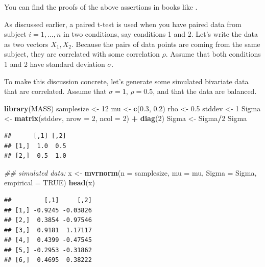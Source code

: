 \documentclass[12pt,]{krantz}
\newenvironment{Shaded}{\begin{snugshade}}{\end{snugshade}}
\newcommand{\CommentTok}[1]{\textcolor[rgb]{0.56,0.35,0.01}{\textit{#1}}}
\newcommand{\DataTypeTok}[1]{\textcolor[rgb]{0.13,0.29,0.53}{#1}}
\newcommand{\DecValTok}[1]{\textcolor[rgb]{0.00,0.00,0.81}{#1}}
\newcommand{\FloatTok}[1]{\textcolor[rgb]{0.00,0.00,0.81}{#1}}
\newcommand{\KeywordTok}[1]{\textcolor[rgb]{0.13,0.29,0.53}{\textbf{#1}}}
\newcommand{\NormalTok}[1]{#1}
\newcommand{\OperatorTok}[1]{\textcolor[rgb]{0.81,0.36,0.00}{\textbf{#1}}}
\newcommand{\OtherTok}[1]{\textcolor[rgb]{0.56,0.35,0.01}{#1}}
\newcommand{\StringTok}[1]{\textcolor[rgb]{0.31,0.60,0.02}{#1}}
\begin{document}
You can find the proofs of the above assertions in books like \citet{rice1995mathematical}.

As discussed earlier, a paired t-test is used when you have paired data from subject \(i=1,...,n\) in two conditions, say conditions 1 and 2. Let's write the data as two vectors \(X_{1}, X_{2}\). Because the pairs of data points are coming from the same subject, they are correlated with some correlation \(\rho\). Assume that both conditions 1 and 2 have standard deviation \(\sigma\).

To make this discussion concrete, let's generate some simulated bivariate data that are correlated. Assume that \(\sigma = 1\),
\(\rho=0.5\), and that the data are balanced.

\begin{Shaded}
\begin{Highlighting}[]
\KeywordTok{library}\NormalTok{(MASS)}
\NormalTok{samplesize <-}\StringTok{ }\DecValTok{12}
\NormalTok{mu <-}\StringTok{ }\KeywordTok{c}\NormalTok{(}\FloatTok{0.3}\NormalTok{, }\FloatTok{0.2}\NormalTok{)}
\NormalTok{rho <-}\StringTok{ }\FloatTok{0.5}
\NormalTok{stddev <-}\StringTok{ }\DecValTok{1}
\NormalTok{Sigma <-}\StringTok{ }\KeywordTok{matrix}\NormalTok{(stddev, }\DataTypeTok{nrow =} \DecValTok{2}\NormalTok{, }\DataTypeTok{ncol =} \DecValTok{2}\NormalTok{) }\OperatorTok{+}\StringTok{ }\KeywordTok{diag}\NormalTok{(}\DecValTok{2}\NormalTok{)}
\NormalTok{Sigma <-}\StringTok{ }\NormalTok{Sigma}\OperatorTok{/}\DecValTok{2}
\NormalTok{Sigma}
\end{Highlighting}
\end{Shaded}

\begin{verbatim}
##      [,1] [,2]
## [1,]  1.0  0.5
## [2,]  0.5  1.0
\end{verbatim}

\begin{Shaded}
\begin{Highlighting}[]
\CommentTok{## simulated data:}
\NormalTok{x <-}\StringTok{ }\KeywordTok{mvrnorm}\NormalTok{(}\DataTypeTok{n =}\NormalTok{ samplesize, }\DataTypeTok{mu =}\NormalTok{ mu, }\DataTypeTok{Sigma =}\NormalTok{ Sigma, }
  \DataTypeTok{empirical =} \OtherTok{TRUE}\NormalTok{)}
\KeywordTok{head}\NormalTok{(x)}
\end{Highlighting}
\end{Shaded}

\begin{verbatim}
##         [,1]     [,2]
## [1,] -0.9245 -0.03826
## [2,]  0.3854 -0.97546
## [3,]  0.9181  1.17117
## [4,]  0.4399 -0.47545
## [5,] -0.2953 -0.31862
## [6,]  0.4695  0.38222
\end{verbatim}
\end{document}
